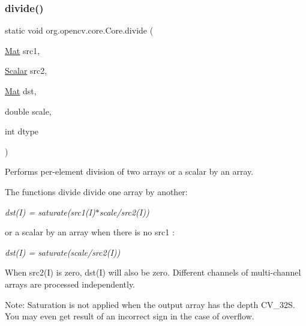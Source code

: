 \subsubsection{\texorpdfstring{divide()}{divide()}\hspace{0.1cm}{\footnotesize\ttfamily [6/8]}}
{\footnotesize\ttfamily static void org.\+opencv.\+core.\+Core.\+divide (\begin{DoxyParamCaption}\item[{\mbox{\hyperlink{classorg_1_1opencv_1_1core_1_1_mat}{Mat}}}]{src1,  }\item[{\mbox{\hyperlink{classorg_1_1opencv_1_1core_1_1_scalar}{Scalar}}}]{src2,  }\item[{\mbox{\hyperlink{classorg_1_1opencv_1_1core_1_1_mat}{Mat}}}]{dst,  }\item[{double}]{scale,  }\item[{int}]{dtype }\end{DoxyParamCaption})\hspace{0.3cm}{\ttfamily [static]}}

Performs per-\/element division of two arrays or a scalar by an array.

The functions {\ttfamily divide} divide one array by another\+:

{\itshape dst(\+I) = saturate(src1(\+I)$\ast$scale/src2(I))}

or a scalar by an array when there is no {\ttfamily src1} \+:

{\itshape dst(\+I) = saturate(scale/src2(I))}

When {\ttfamily src2(\+I)} is zero, {\ttfamily dst(\+I)} will also be zero. Different channels of multi-\/channel arrays are processed independently.

Note\+: Saturation is not applied when the output array has the depth {\ttfamily C\+V\+\_\+32S}. You may even get result of an incorrect sign in the case of overflow.


